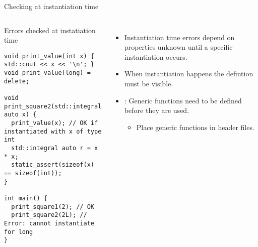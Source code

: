 \begin{frame}[t,fragile]{Checking at instantiation time}

\begin{columns}[T]


\begin{block}{Errors checked at instatiation time}
\begin{lstlisting}
void print_value(int x) { std::cout << x << '\n'; }
void print_value(long) = delete;

void print_square2(std::integral auto x) {
  print_value(x); // OK if instantiated with x of type int
  std::integral auto r = x * x;
  static_assert(sizeof(x) == sizeof(int));
}

int main() {
  print_square1(2); // OK
  print_square2(2L); // Error: cannot instantiate for long
}
\end{lstlisting}
\end{block}


\pause
\begin{itemize}
  \item Instantiation time errors depend on properties unknown until a specific instantiation occurs.

  \item When instantiation happens the defintion must be visible.

  \item {}: Generic functions need to be defined before they are used.
    \begin{itemize}
      \item Place generic functions in header files.
    \end{itemize}
\end{itemize}

\end{columns}

\end{frame}
